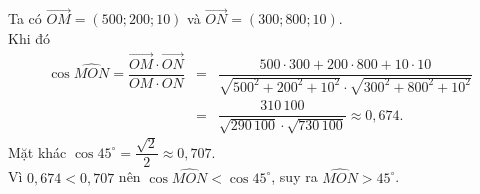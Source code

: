 \begin{ex}
{\begin{itemchoice}
			\itemch Ta có $\overrightarrow{OM} = (500; 200; 10)$ và $\overrightarrow{ON} = (300; 800; 10)$.\\
			Khi đó 
			\allowdisplaybreaks
			\begin{eqnarray*}
				\cos \widehat{MON} = \dfrac{\overrightarrow{OM} \cdot \overrightarrow{ON}}{OM \cdot ON} &=& \dfrac{500 \cdot 300 + 200 \cdot 800 + 10 \cdot 10}{\sqrt{500^2 + 200^2 + 10^2} \cdot \sqrt{300^2 + 800^2 + 10^2}} \\
				&=& \dfrac{310\,100}{\sqrt{290\,100} \cdot \sqrt{730\,100}} \approx 0{,}674.
			\end{eqnarray*}
			Mặt khác $\cos 45^{\circ} = \dfrac{\sqrt{2}}{2} \approx 0{,}707$.\\
			Vì $0{,}674 < 0{,}707$ nên $\cos \widehat{MON} < \cos 45^{\circ}$, suy ra $\widehat{MON} > 45^{\circ}$.
		\end{itemchoice}
	}
\end{ex}

